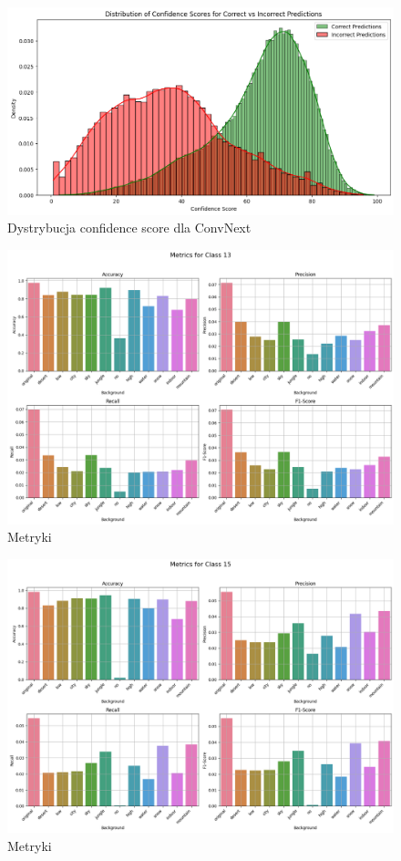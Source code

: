 \begin{figure}
	\centering\includegraphics[width=.9\textwidth]{img/convnext_conf_distro}
	\caption{Dystrybucja confidence score dla ConvNext}
	\label{rys:conv_c_distro}
\end{figure}

\begin{figure}
	\centering\includegraphics[width=.9\textwidth]{img/13}
	\caption{Metryki}
	\label{rys:13}
\end{figure}

\begin{figure}
	\centering\includegraphics[width=.9\textwidth]{img/15}
	\caption{Metryki}
	\label{rys:15}
\end{figure}

